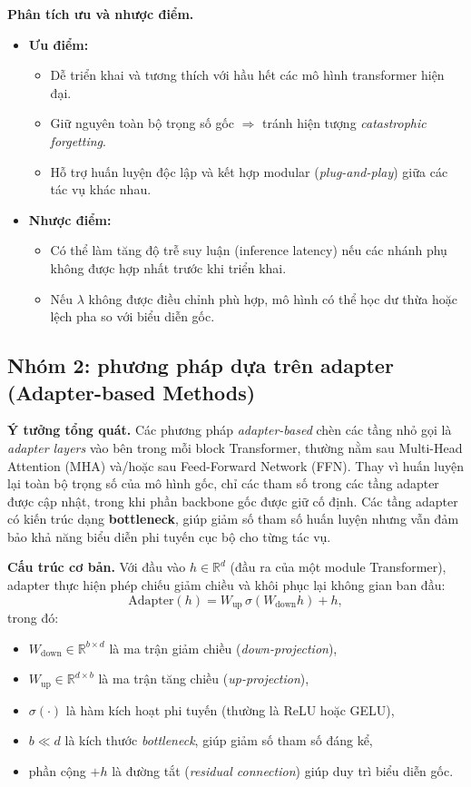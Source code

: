 \textbf{Phân tích ưu và nhược điểm.}
\begin{itemize}
	\item \textbf{Ưu điểm:}  
	\begin{itemize}
		\item Dễ triển khai và tương thích với hầu hết các mô hình transformer hiện đại.  
		\item Giữ nguyên toàn bộ trọng số gốc $\Rightarrow$ tránh hiện tượng \textit{catastrophic forgetting}.  
		\item Hỗ trợ huấn luyện độc lập và kết hợp modular (\textit{plug-and-play}) giữa các tác vụ khác nhau.  
	\end{itemize}
	\item \textbf{Nhược điểm:}  
	\begin{itemize}
		\item Có thể làm tăng độ trễ suy luận (inference latency) nếu các nhánh phụ không được hợp nhất trước khi triển khai.  
		\item Nếu $\lambda$ không được điều chỉnh phù hợp, mô hình có thể học dư thừa hoặc lệch pha so với biểu diễn gốc.  
	\end{itemize}
\end{itemize}

\subsection{Nhóm 2: phương pháp dựa trên adapter (Adapter-based Methods)}
\label{ssec:adapters}

\textbf{Ý tưởng tổng quát.}  
Các phương pháp \textit{adapter-based} chèn các tầng nhỏ gọi là \emph{adapter layers} vào bên trong mỗi block Transformer, thường nằm sau Multi-Head Attention (MHA) và/hoặc sau Feed-Forward Network (FFN).  
Thay vì huấn luyện lại toàn bộ trọng số của mô hình gốc, chỉ các tham số trong các tầng adapter được cập nhật, trong khi phần backbone gốc được giữ cố định.  
Các tầng adapter có kiến trúc dạng \textbf{bottleneck}, giúp giảm số tham số huấn luyện nhưng vẫn đảm bảo khả năng biểu diễn phi tuyến cục bộ cho từng tác vụ.

\textbf{Cấu trúc cơ bản.}  
Với đầu vào $h \in \mathbb{R}^d$ (đầu ra của một module Transformer), adapter thực hiện phép chiếu giảm chiều và khôi phục lại không gian ban đầu:
\[
\text{Adapter}(h) = W_{\text{up}} \, \sigma(W_{\text{down}} h) + h,
\]
trong đó:
\begin{itemize}
	\item $W_{\text{down}} \in \mathbb{R}^{b \times d}$ là ma trận giảm chiều (\textit{down-projection}),
	\item $W_{\text{up}} \in \mathbb{R}^{d \times b}$ là ma trận tăng chiều (\textit{up-projection}),
	\item $\sigma(\cdot)$ là hàm kích hoạt phi tuyến (thường là ReLU hoặc GELU),
	\item $b \ll d$ là kích thước \textit{bottleneck}, giúp giảm số tham số đáng kể,
	\item phần cộng $+h$ là đường tắt (\textit{residual connection}) giúp duy trì biểu diễn gốc.
\end{itemize}

